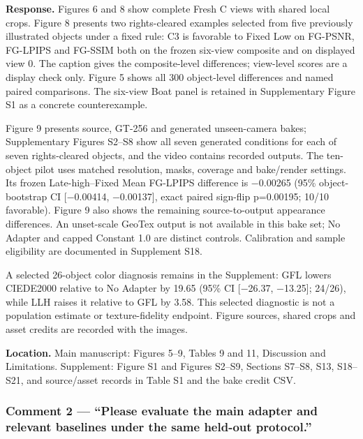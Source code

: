 \documentclass[
]{article}
\begin{document}
\textbf{Response.} Figures 6 and 8 show complete Fresh C views with
shared local crops. Figure 8 presents two rights-cleared examples
selected from five previously illustrated objects under a fixed rule: C3
is favorable to Fixed Low on FG-PSNR, FG-LPIPS and FG-SSIM both on the
frozen six-view composite and on displayed view 0. The caption gives the
composite-level differences; view-level scores are a display check only.
Figure 5 shows all 300 object-level differences and named paired
comparisons. The six-view Boat panel is retained in Supplementary Figure
S1 as a concrete counterexample.

Figure 9 presents source, GT-256 and generated unseen-camera bakes;
Supplementary Figures S2--S8 show all seven generated conditions for
each of seven rights-cleared objects, and the video contains recorded
outputs. The ten-object pilot uses matched resolution, masks, coverage
and bake/render settings. Its frozen Late-high--Fixed Mean FG-LPIPS
difference is −0.00265 (95\% object-bootstrap CI {[}−0.00414,
−0.00137{]}, exact paired sign-flip p=0.00195; 10/10 favorable). Figure
9 also shows the remaining source-to-output appearance differences. An
unset-scale GeoTex output is not available in this bake set; No Adapter
and capped Constant 1.0 are distinct controls. Calibration and sample
eligibility are documented in Supplement S18.

A selected 26-object color diagnosis remains in the Supplement: GFL
lowers CIEDE2000 relative to No Adapter by 19.65 (95\% CI {[}−26.37,
−13.25{]}; 24/26), while LLH raises it relative to GFL by 3.58. This
selected diagnostic is not a population estimate or texture-fidelity
endpoint. Figure sources, shared crops and asset credits are recorded
with the images.

\textbf{Location.} Main manuscript: Figures 5--9, Tables 9 and 11,
Discussion and Limitations. Supplement: Figure S1 and Figures S2--S9,
Sections S7--S8, S13, S18--S21, and source/asset records in Table S1 and
the bake credit CSV.

\hypertarget{comment-2-please-evaluate-the-main-adapter-and-relevant-baselines-under-the-same-held-out-protocol.}{%
\subsubsection{Comment 2 --- ``Please evaluate the main adapter and
relevant baselines under the same held-out
protocol.''}\label{comment-2-please-evaluate-the-main-adapter-and-relevant-baselines-under-the-same-held-out-protocol.}}
\end{document}
